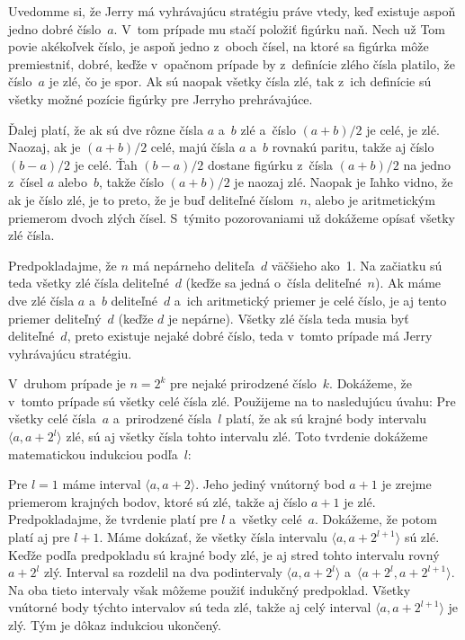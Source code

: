 {Uvedomme si, že Jerry má vyhrávajúcu stratégiu práve vtedy, keď
existuje aspoň jedno dobré číslo~$a$. V~tom prípade mu stačí
položiť figúrku naň. Nech už Tom povie akékoľvek číslo, je
aspoň jedno z~oboch čísel, na ktoré sa figúrka môže premiestniť,
dobré, keďže v~opačnom prípade by z~definície zlého čísla
platilo, že číslo~$a$ je zlé, čo je spor. Ak sú naopak všetky
čísla zlé, tak z~ich definície sú všetky možné pozície
figúrky pre Jerryho prehrávajúce.

Ďalej platí, že ak sú dve rôzne čísla $a$ a~$b$ zlé a~číslo
$(a+b) / 2$ je celé, je zlé. Naozaj, ak je $(a+b) / 2$ celé,
majú čísla $a$ a~$b$ rovnakú paritu, takže aj číslo $(b-a) / 2$ je
celé. Ťah $(b-a) / 2$ dostane figúrku z~čísla $(a+b) / 2$ na jedno
z~čísel $a$ alebo~$b$, takže číslo $(a+b) / 2$ je naozaj zlé. Naopak
je ľahko vidno, že ak je číslo zlé, je to preto, že je
buď deliteľné číslom~$n$, alebo je aritmetickým priemerom dvoch zlých
čísel. S~týmito pozorovaniami už dokážeme opísať všetky zlé
čísla.

Predpokladajme, že $n$ má nepárneho deliteľa~$d$ väčšieho ako~1.
Na začiatku sú teda všetky zlé čísla deliteľné~$d$ (keďže sa jedná
o~čísla deliteľné~$n$). Ak máme dve zlé čísla $a$ a~$b$
deliteľné~$d$ a~ich aritmetický priemer je celé číslo, je
aj tento priemer deliteľný~$d$ (keďže $d$ je nepárne). Všetky
zlé čísla teda musia byť deliteľné~$d$, preto existuje nejaké
dobré číslo, teda v~tomto prípade má Jerry vyhrávajúcu stratégiu.

V~druhom prípade je $n = 2^k$ pre nejaké prirodzené číslo~$k$.
Dokážeme, že v~tomto prípade sú všetky celé čísla zlé.
Použijeme na to nasledujúcu úvahu: Pre všetky celé čísla~$a$
a~prirodzené čísla~$l$ platí, že ak sú krajné body intervalu
$\langle a, {a+2^l}\rangle$ zlé, sú aj všetky čísla tohto intervalu
zlé. Toto tvrdenie dokážeme matematickou indukciou podľa~$l$:

Pre $l = 1$ máme interval $\langle a, a+2 \rangle$. Jeho jediný
vnútorný bod $a+1$ je zrejme priemerom krajných bodov, ktoré sú
zlé, takže aj číslo $a+1$ je zlé. Predpokladajme, že tvrdenie
platí pre $l$ a~všetky celé~$a$. Dokážeme, že potom platí aj pre
$l+1$. Máme dokázať, že všetky čísla intervalu $\langle a,
a+2^{l+1} \rangle$ sú zlé. Keďže podľa predpokladu sú krajné
body zlé, je aj stred tohto intervalu rovný $a+2^l$ zlý.
Interval sa rozdelil na dva podintervaly $\langle a, a+2^l \rangle$
a~$\langle a+2^l, a+2^{l+1} \rangle$. Na oba tieto intervaly však môžeme
použiť indukčný predpoklad.
Všetky vnútorné
body týchto intervalov sú teda zlé, takže aj celý interval
$\langle a, a+2^{l+1} \rangle$ je zlý. Tým je dôkaz indukciou
ukončený.

}
